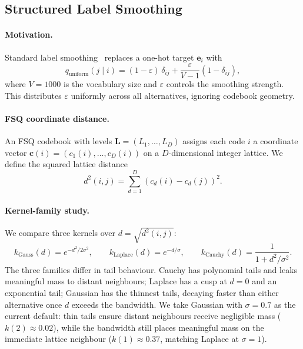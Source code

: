 \documentclass{article}
\newcommand{\vocabsize}{1000}
\begin{document}
\subsection{Structured Label Smoothing}
\label{sec:sls}

\paragraph{Motivation.}
Standard label smoothing~\citep{szegedy2016rethinking} replaces a one-hot target $\mathbf{e}_i$ with
\begin{equation}
  q_\text{uniform}(j \mid i) = (1 - \varepsilon)\,\delta_{ij} + \frac{\varepsilon}{V - 1}(1 - \delta_{ij}),
  \label{eq:uniform_ls}
\end{equation}
where $V = \vocabsize$ is the vocabulary size and $\varepsilon$ controls the smoothing strength.
This distributes $\varepsilon$ uniformly across all alternatives, ignoring codebook geometry.

\paragraph{FSQ coordinate distance.}
An FSQ codebook with levels $\mathbf{L} = (L_1, \dots, L_D)$ assigns each code $i$ a coordinate vector $\mathbf{c}(i) = (c_1(i), \dots, c_D(i))$ on a $D$-dimensional integer lattice.
We define the squared lattice distance
\begin{equation}
  d^2(i, j) = \sum_{d=1}^{D} \left( c_d(i) - c_d(j) \right)^2.
  \label{eq:fsq_dist}
\end{equation}

\paragraph{Kernel-family study.}
We compare three kernels over $d = \sqrt{d^2(i, j)}$:
\begin{equation}
  k_{\text{Gauss}}(d) = e^{-d^2/2\sigma^2}, \qquad
  k_{\text{Laplace}}(d) = e^{-d/\sigma}, \qquad
  k_{\text{Cauchy}}(d) = \frac{1}{1 + d^2/\sigma^2}.
  \label{eq:kernels}
\end{equation}
The three families differ in tail behaviour.
Cauchy has polynomial tails and leaks meaningful mass to distant neighbours; Laplace has a cusp at $d=0$ and an exponential tail; Gaussian has the thinnest tails, decaying faster than either alternative once $d$ exceeds the bandwidth.
We take Gaussian with $\sigma = 0.7$ as the current default: thin tails ensure distant neighbours receive negligible mass ($k(2) \approx 0.02$), while the bandwidth still places meaningful mass on the immediate lattice neighbour ($k(1) \approx 0.37$, matching Laplace at $\sigma = 1$).
\end{document}
